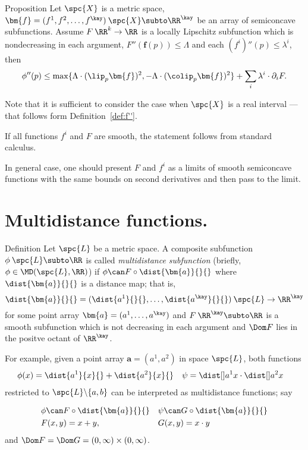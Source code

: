 \begin{thm}{Proposition}\label{prop:composite+convex}
Let $\spc{X}$ is a metric space,
$\bm{f}=(f^1,f^2,\dots,f^\kay)\:\spc{X}\subto\RR^\kay$
be an array of semiconcave subfunctions.
Assume $F\:\RR^k\to\RR$ is a locally Lipschitz subfunction which is nondecreasing in each argument,
$F''(\bm{f}(p))\le \Lambda$  
and each $(f^i)''(p)\le \lambda^i$, 
then
\[
\phi''(p)
\le
\max
\{\Lambda\cdot(\lip_p\bm{f})^2,-\Lambda\cdot(\colip_p\bm{f})^2\}
+\sum_i\lambda^i\cdot\partial_iF.
\]
\end{thm}

Note that it is sufficient to consider the case when $\spc{X}$ is a real interval 
--- that follows form Definition~\ref{def:f''}.

If all functions $f^i$ and $F$ are smooth,
the statement follows from standard calculus.

In general case, one should present $F$ and $f^i$ as a limits of smooth semiconcave functions with the same bounds on second derivatives and then pass to the limit.
\qeds

\section{Multidistance functions.}

\begin{thm}{Definition}\label{def:MD}
Let $\spc{L}$ be a metric space.
A composite  subfunction $\phi\:\spc{L}\subto\RR$ is called \emph{multidistance subfunction}%
(briefly, $\phi\in \MD(\spc{L},\RR)$) 
if
$\phi\can F\circ\dist{\bm{a}}{}{}$ 
where $\dist{\bm{a}}{}{}$ is a distance map; that is,
\[
\dist{\bm{a}}{}{}
=
(\dist{a^1}{}{},\dots,\dist{a^\kay}{}{})\:\spc{L}\to\RR^\kay
\]
for some point array $\bm{a}=(a^1,\dots,a^\kay)$ and 
$F\:\RR^\kay\subto\RR$ is a smooth subfunction
which is not decreasing in each argument
and 
$\Dom F$
lies in the positve octant of $\RR^\kay$.
\end{thm}

For example, 
given a point array $\bm{a}=(a^1,a^2)$ in space $\spc{L}$,
both functions 
\begin{align*}
\phi(x)&=\dist{a^1}{x}{}+\dist{a^2}{x}{}
&
\psi&=\dist[{{}}]{a^1}{x}{}\cdot\dist[{{}}]{a^2}{x}{}
\end{align*}
 restricted to $\spc{L}\backslash \{a,b\}$ 
can be interpreted as multidistance functions;
say

\begin{align*}
&\phi\can F\circ\dist{\bm{a}}{}{}
&
&\psi\can G\circ\dist{\bm{a}}{}{}
\\
&F(x,y)=x+y, 
&
&G(x,y)=x\cdot y
\end{align*}
and $\Dom F=\Dom G=(0,\infty)\times(0,\infty)$.


